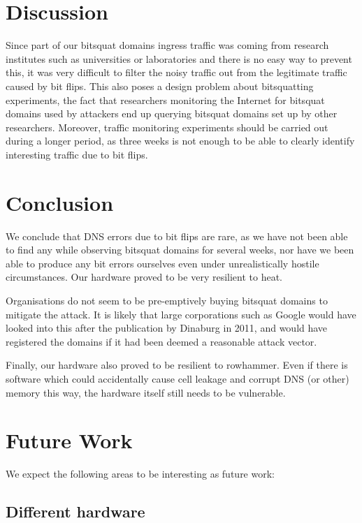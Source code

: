 \documentclass[conference]{IEEEtran}
\begin{document}
\section{Discussion}\label{sec:disc}

Since part of our bitsquat domains ingress traffic was coming from
research institutes such as universities or laboratories and there is no easy
way to prevent this, it was very difficult to filter the noisy traffic out from
the legitimate traffic caused by bit flips. This also poses a design problem
about bitsquatting experiments, the fact that researchers monitoring the
Internet for bitsquat domains used by attackers end up querying
bitsquat domains set up by other researchers. Moreover, traffic monitoring
experiments should be carried out during a longer period, as three weeks is not
enough to be able to clearly identify interesting traffic due to bit flips.


\section{Conclusion}\label{sec:conc}

We conclude that DNS errors due to bit flips are rare, as we have not been able
to find any while observing bitsquat domains for several weeks, nor have we
been able to produce any bit errors ourselves even under unrealistically
hostile circumstances. Our hardware proved to be very resilient to heat.

Organisations do not seem to be pre-emptively buying bitsquat domains to
mitigate the attack. It is likely that large corporations such as Google would
have looked into this after the publication by Dinaburg in 2011, and would have
registered the domains if it had been deemed a reasonable attack vector.

Finally, our hardware also proved to be resilient to rowhammer. Even if there is
software which could accidentally cause cell leakage and corrupt DNS (or other)
memory this way, the hardware itself still needs to be vulnerable.


\section{Future Work}\label{sec:futwork}

We expect the following areas to be interesting as future work:

\subsection{Different hardware}
\end{document}

